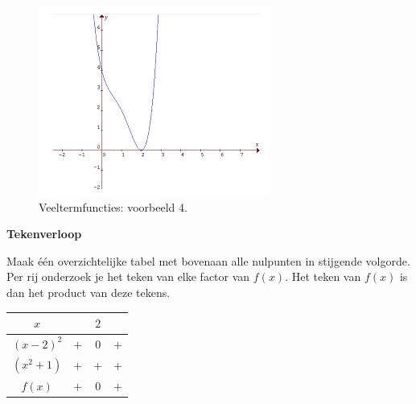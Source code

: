 \begin{figure}[h]
\centering{}\includegraphics[width=.6\linewidth]{2_elem_rekenvaardigheden_B/inputs/veeltermfuncties4.jpg} 
\caption{Veeltermfuncties: voorbeeld 4.}
\label{fig:vt:vb4}
\end{figure}


\textbf{Tekenverloop}

Maak \'e\'en overzichtelijke tabel met bovenaan alle nulpunten
in stijgende volgorde. Per rij onderzoek je het teken van elke factor
van $f(x)$. Het teken van $f(x)$ is dan het product van deze tekens.

\begin{center}
\begin{tabular}{c||c|c|c}
$x$ &  & $2$ & \\
\hline 
$(x-2)^{2}$ & $+$ & $0$ & \multicolumn{1}{c}{$+$}\\
$(x^{2}+1)$ & +&+&+\\
\hline 
$f(x)$ & $+$ & $0$ & $+$\\
\end{tabular}
\par\end{center}
